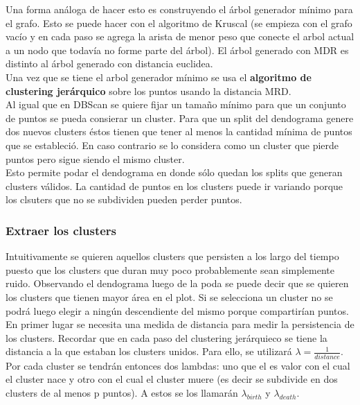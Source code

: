 \documentclass[titlepage,a4paper]{article}
\begin{document}
Una forma análoga de hacer esto es construyendo el árbol generador mínimo para el grafo. Esto se puede hacer con el algoritmo de Kruscal (se empieza con el grafo vacío y en cada paso se agrega la arista de menor peso que conecte el arbol actual a un nodo que todavía no forme parte del árbol). El árbol generado con MDR es distinto al árbol generado con distancia euclidea. \\

Una vez que se tiene el arbol generador mínimo se usa el \textbf{algoritmo de clustering jerárquico} sobre los puntos usando la distancia MRD. \\

Al igual que en DBScan se quiere fijar un tamaño mínimo para que un conjunto de puntos se pueda consierar un cluster. Para que un split del dendograma genere dos nuevos clusters éstos tienen que tener al menos la cantidad mínima de puntos que se estableció. En caso contrario se lo considera como un cluster que pierde puntos pero sigue siendo el mismo cluster. \\

Esto permite podar el dendograma en donde sólo quedan los splits que generan clusters válidos. La cantidad de puntos en los clusters puede ir variando porque los clsuters que no se subdividen pueden perder puntos. 

\subsubsection*{Extraer los clusters}
Intuitivamente se quieren aquellos clusters que persisten a los largo del tiempo puesto que los clusters que duran muy poco probablemente sean simplemente ruido. Observando el dendograma luego de la poda se puede decir que se quieren los clusters que tienen mayor área en el plot. Si se selecciona un cluster no se podrá luego elegir a ningún descendiente del mismo porque compartirían puntos. \\

En primer lugar se necesita una medida de distancia para medir la persistencia de los clusters. Recordar que en cada paso del clustering jerárquieco se tiene la distancia a la que estaban los clusters unidos. Para ello, se utilizará $\lambda= \frac{1}{distance}$. Por cada cluster se tendrán entonces dos lambdas: uno que el es valor con el cual el cluster nace y otro con el cual el cluster muere (es decir se subdivide en dos clusters de al menos p puntos). A estos se los llamarán $\lambda_{birth}$ y $\lambda_{death}$. \\
\end{document}
